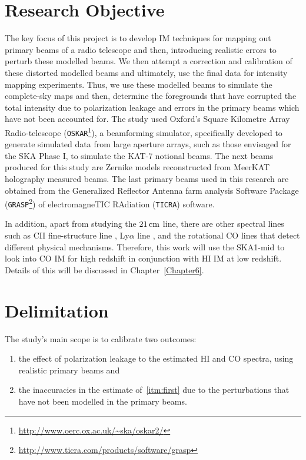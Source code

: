 \section{Research Objective} \label{chap1:sec5}
The key focus of this project is to develop IM techniques for mapping out primary beams of a radio telescope and then, introducing realistic errors to perturb these modelled beams.
We then attempt a correction and calibration of these distorted modelled beams and ultimately, use the final data for intensity mapping experiments. Thus, we use
these modelled beams to simulate  the complete-sky maps and then, determine the foregrounds that have corrupted the total intensity due to polarization leakage and errors in the primary beams which
have not been accounted for. The study used Oxford's Square Kilometre Array Radio-telescope (\texttt{OSKAR}\footnote{\url{http://www.oerc.ox.ac.uk/~ska/oskar2/}}),
a beamforming simulator, specifically developed to generate simulated data from large aperture arrays, such as those envisaged for the SKA Phase I, to simulate the KAT-7
notional beams. The next beams produced for this study are Zernike models reconstructed from MeerKAT holography measured beams. 
The last primary beams used in this research are obtained from the Generalized Reflector Antenna farm analysis Software Package
(\texttt{GRASP}\footnote{\url{ http://www.ticra.com/products/software/grasp}}) of electromagneTIC RAdiation (\texttt{TICRA}) software.

In addition, apart from studying the $21\, \rm{cm}$ line, there are other spectral lines such as 
CII fine-structure line \citep{2012ApJ...745...49G,2015ApJ...806..209S,2015MNRAS.450.3829Y},
Ly$\alpha$ line \citep{2017MNRAS.464..469S,Tapken:2007ja,2015ApJ...810L..12Z}, and the rotational CO lines \citep{Lidz:2011dx,padmanabhan2017constraining,vallini2017co} that detect
different physical mechanisms. Therefore, this work will use the SKA1-mid to look into CO IM for high redshift in conjunction with HI IM at low redshift. Details of this
will be discussed in Chapter~\ref{Chapter6}.

\section{Delimitation} \label{chap1:sec6}
%
The study's main scope is to calibrate two outcomes: 
\begin{enumerate}[label=(\roman*)]
\item the effect of polarization leakage to the estimated HI and CO spectra, using realistic primary beams and \label{itm:first}
\item the inaccuracies in the estimate of~\ref{itm:first} due to the perturbations that have not been modelled in the primary beams.
\end{enumerate}
% 
% 

